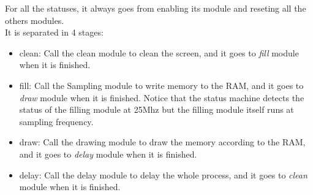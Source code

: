 \documentclass[11pt]{scrartcl}
\begin{document}
For all the statuses, it always goes from enabling its module and reseting all the others modules. \\


It is separated in 4 stages:
\begin{itemize}
    \item clean:
    Call the clean module to clean the screen, and it goes to \textit{fill} module when it is finished.
    \item fill:
    Call the Sampling module to write memory to the RAM, and it goes to \textit{draw} module when it is finished. Notice that the status machine detects the status of the filling module at 25Mhz but the filling module itself runs at sampling frequency.
    \item draw:
    Call the drawing module to draw the memory according to the RAM, and it goes to \textit{delay} module when it is finished.
    \item delay:
    Call the delay module to delay the whole process, and it goes to \textit{clean} module when it is finished.
\end{itemize}
\end{document}

